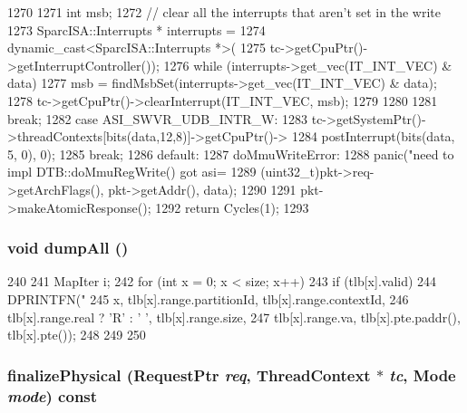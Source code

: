 \begin{DoxyCode}
{{1270         {
1271             int msb;
1272             // clear all the interrupts that aren't set in the write
1273             SparcISA::Interrupts * interrupts =
1274                 dynamic_cast<SparcISA::Interrupts *>(
1275                         tc->getCpuPtr()->getInterruptController());
1276             while (interrupts->get_vec(IT_INT_VEC) & data) {
1277                 msb = findMsbSet(interrupts->get_vec(IT_INT_VEC) & data);
1278                 tc->getCpuPtr()->clearInterrupt(IT_INT_VEC, msb);
1279             }
1280         }
1281         break;
1282       case ASI_SWVR_UDB_INTR_W:
1283             tc->getSystemPtr()->threadContexts[bits(data,12,8)]->getCpuPtr()->
1284             postInterrupt(bits(data, 5, 0), 0);
1285         break;
1286       default:
1287 doMmuWriteError:
1288         panic("need to impl DTB::doMmuRegWrite() got asi=%
1289             (uint32_t)pkt->req->getArchFlags(), pkt->getAddr(), data);
1290     }
1291     pkt->makeAtomicResponse();
1292     return Cycles(1);
1293 }
\end{DoxyCode}
\hypertarget{classSparcISA_1_1TLB_a8cb66fc5f158a5d28cb9e5d73ecd26cc}{
\subsubsection[{dumpAll}]{\setlength{\rightskip}{0pt plus 5cm}void dumpAll ()}}
\label{classSparcISA_1_1TLB_a8cb66fc5f158a5d28cb9e5d73ecd26cc}



\begin{DoxyCode}
240 {
241     MapIter i;
242     for (int x = 0; x < size; x++) {
243         if (tlb[x].valid) {
244            DPRINTFN("%
245                    x, tlb[x].range.partitionId, tlb[x].range.contextId,
246                    tlb[x].range.real ? 'R' : ' ', tlb[x].range.size,
247                    tlb[x].range.va, tlb[x].pte.paddr(), tlb[x].pte());
248         }
249     }
250 }
\end{DoxyCode}
\hypertarget{classSparcISA_1_1TLB_ae199d95c42e036851a8a0543c6d6d2e3}{
\subsubsection[{finalizePhysical}]{ finalizePhysical ({\bf RequestPtr} {\em req}, \/  {\bf ThreadContext} $\ast$ {\em tc}, \/  {\bf Mode} {\em mode}) const}}
\label{classSparcISA_1_1TLB_ae199d95c42e036851a8a0543c6d6d2e3}



